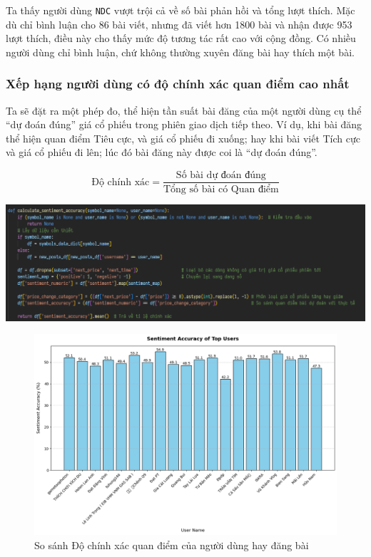 Ta thấy người dùng \texttt{NDC} vượt trội cả về số bài phản hồi và tổng lượt thích. Mặc dù chỉ bình luận cho 86 bài viết, nhưng đã viết hơn 1800 bài và nhận được 953 lượt thích, điều này cho thấy mức độ tương tác rất cao với cộng đồng. Có nhiều người dùng chỉ bình luận, chứ không thường xuyên đăng bài hay thích một bài.

\subsubsection{Xếp hạng người dùng có độ chính xác quan điểm cao nhất}

Ta sẽ đặt ra một phép đo, thể hiện tần suất bài đăng của một người dùng cụ thể ``dự đoán đúng'' giá cổ phiếu trong phiên giao dịch tiếp theo. Ví dụ, khi bài đăng thể hiện quan điểm Tiêu cực, và giá cổ phiếu đi xuống; hay khi bài viết Tích cực và giá cổ phiếu đi lên; lúc đó bài đăng này được coi là ``dự đoán đúng''.

\[
\text{Độ chính xác} = \frac{\text{Số bài dự đoán đúng}}{\text{Tổng số bài có Quan điểm}}
\]

\begin{center}
    \includegraphics[width=1\linewidth]{images/code-2.20-sentimentacc.png}
\end{center}

\begin{figure}[H]
    \centering
    \includegraphics[width = 0.75\linewidth]{images/C2_pic19.png}
    \caption{So sánh Độ chính xác quan điểm của người dùng hay đăng bài}
    \label{fig:2.21}
\end{figure}

